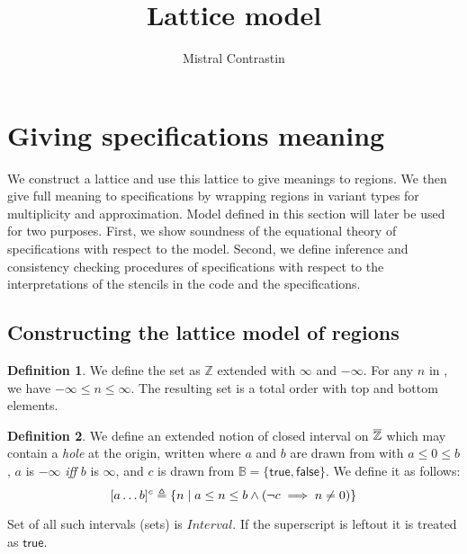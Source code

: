\documentclass[acmlarge,review]{acmart}
\theoremstyle{definition}
\newtheorem{defn}{Definition}
\theoremstyle{plain}
\theoremstyle{remark}
\begin{document}
\title{Lattice model}
\author{Mistral Contrastin}

\section{Giving specifications meaning}

We construct a lattice and use this lattice to give meanings to regions. We
then give full meaning to specifications by wrapping regions in variant types
for multiplicity and approximation. Model defined in this section will later be
used for two purposes. First, we show soundness of the equational theory of
specifications with respect to the model. Second, we define inference and
consistency checking procedures of specifications with respect to the
interpretations of the stencils in the code and the specifications.

\subsection{Constructing the lattice model of regions}

\begin{defn}
  We define the set \zinf{} as
  $\mathbb{Z}$ extended with $\infty$ and $-\infty$. For any $n$ in
  \zinf{}, we have $-\infty \leq n \leq \infty$. The resulting set is
  a total order with top and bottom elements.
\end{defn}

\begin{defn}
  We define an extended notion of closed interval on $\textnormal{$\overline{\mathbb{Z}}$}{}$ which may contain
  a \emph{hole} at the origin, written  where $a$ and $b$ are
  drawn from \zinf{} with $a \leq 0 \leq b$, $a$ is $-\infty$ \emph{iff} $b$ is
  $\infty$, and $c$ is drawn from $\mathbb{B} = \{ \mathsf{true}, \mathsf{false}
  \}$. We define it as follows:
%
  \begin{equation*}
    \textnormal{$\lbrack a\dots b\rbrack^{c}$} \triangleq
      \{ n \mid a \leq n \leq b \wedge (\neg c \implies n \neq 0) \}
  \end{equation*}

  Set of all such intervals (sets) is $\textit{Interval}$. If the superscript is
  leftout it is treated as $\mathsf{true}$.
\end{defn}
\end{document}
